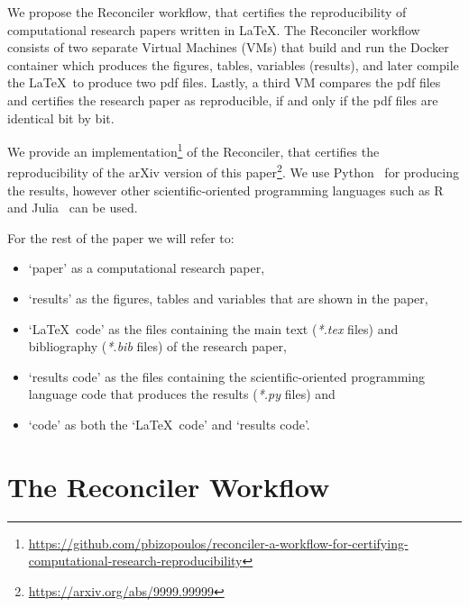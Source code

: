 \documentclass[journal]{IEEEtran}
\begin{document}
We propose the Reconciler workflow, that certifies the reproducibility of computational research papers written in \LaTeX.
The Reconciler workflow consists of two separate Virtual Machines (VMs) that build and run the Docker container which produces the figures, tables, variables (results), and later compile the \LaTeX\ to produce two pdf files.
Lastly, a third VM compares the pdf files and certifies the research paper as reproducible, if and only if the pdf files are identical bit by bit.

We provide an implementation\footnote{\url{https://github.com/pbizopoulos/reconciler-a-workflow-for-certifying-computational-research-reproducibility}} of the Reconciler, that certifies the reproducibility of the arXiv version of this paper\footnote{\url{https://arxiv.org/abs/9999.99999}}.
We use Python~\cite{van2007python} for producing the results, however other scientific-oriented programming languages such as R~\cite{ihaka1996r} and Julia~\cite{bezanson2017julia} can be used.

For the rest of the paper we will refer to:
\begin{itemize}
	\item `paper' as a computational research paper,
	\item `results' as the figures, tables and variables that are shown in the paper,
	\item `\LaTeX\ code' as the files containing the main text (\textit{*.tex} files) and bibliography (\textit{*.bib} files) of the research paper,
	\item `results code' as the files containing the scientific-oriented programming language code that produces the results (\textit{*.py} files) and
	\item `code' as both the `\LaTeX\ code' and `results code'.
\end{itemize}

\section{The Reconciler Workflow}
\end{document}
